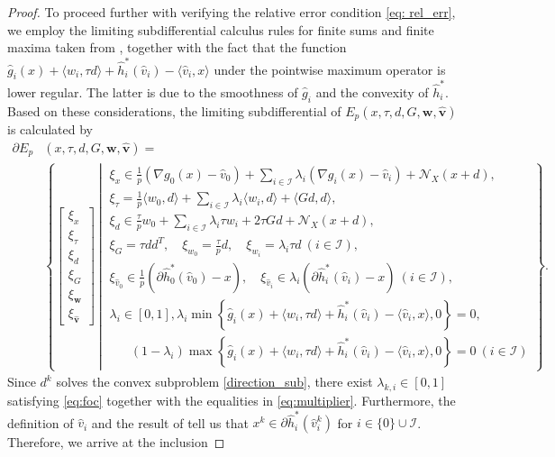 \documentclass[11pt,a4paper]{article}
\def\hat{\widehat}\def\Hat{\widehat}
\theoremstyle{plain}
\begin{document}
\begin{proof}
To proceed further with verifying the relative error condition \eqref{eq: rel_err}, we employ the limiting subdifferential calculus rules for finite sums and finite maxima taken from \cite[Theorem~2.19 and 4.10]{mordukhovich2018variational}, together {with} the fact that the function $\hat g_i(x)+\langle w_i,\tau d\rangle+\hat{h}_i^*(\hat v_i)-\langle \hat{v}_i,x\rangle$ under the pointwise maximum operator is lower regular. The latter is due to the smoothness of $\hat g_i$ and the convexity of $\hat{h}_i^*$.
Based on these considerations, the limiting subdifferential of $E_{p}(x,\tau,d,G,{\mathbf{w},\mathbf{\hat{v}}})$ is calculated by
\begin{equation*}
    \begin{aligned}
        \partial E_p&(x,\tau,d,G,{\mathbf{w},\mathbf{\hat{v}}}) =\\
        &\left\{
\begin{bmatrix}
\xi_x\\ \xi_\tau\\ \xi_d \\ \xi_G \\ {\xi_{\mathbf{w}}}\\ {\xi_{\mathbf{\hat{v}}}}
\end{bmatrix} 
~\left| ~\begin{array}{l}
\xi_x \in \frac{1}{p}\left(\nabla g_0(x) - {\hat{v}_0} \right) + {\sum_{i\in\mathcal I} \lambda_i}\left( \nabla g_i(x) - {\hat{v}_i}\right) + \mathcal{N}_X(x+d),\\
\xi_\tau = \frac{1}{p}\langle w_0, d \rangle + {\sum_{i\in\mathcal I} \lambda_i} \langle w_i, d \rangle + \langle Gd,d\rangle, \\
\xi_d \in \frac{\tau}{p}w_0 + {\sum_{i\in\mathcal I} \lambda_i} \tau w_i + 2\tau G d + \mathcal{N}_X(x+d), \\
\xi_G = {\tau} dd^T, \quad {\xi_{w_0} = \frac{\tau}{p}d, \quad \xi_{w_i} = \lambda_i \tau d \ (i\in\mathcal I)}, \\
{\xi_{\hat{v}_0}} \in \frac{1}{p}\left(\partial \hat{h}_0^*({\hat{v}_0})-x\right), \quad {\xi_{\hat{v}_i}} \in {\lambda_i}\left(\partial \hat{h}_i^*({\hat{v}_i})-x\right) {\ (i\in\mathcal I)}, \\
{\lambda_i} \in [0,1], {\lambda_i} \min\left\{\hat{g}_i(x)+\langle w_i,\tau d\rangle+\hat{h}_i^*({\hat{v}_i})-\langle {\hat{v}_i},x\rangle, 0 \right\} = 0, \\ 
\quad\,\,\,\, (1- {\lambda_i})\max\left\{ \hat{g}_i(x)+\langle w_i,\tau d\rangle+\hat{h}_i^*({\hat{v}_i})-\langle {\hat{v}_i},x\rangle, 0 \right\} = 0 {\ (i\in\mathcal I)}
\end{array}\right. \right\}.
    \end{aligned}
\end{equation*}
Since $d^k$ solves the convex subproblem \eqref{direction_sub}, there {exist $\lambda_{k,i} \in \left[0, 1\right]$} satisfying \eqref{eq:foc} together with the equalities in \eqref{eq:multiplier}. Furthermore, the definition of $\hat{v}_i$ and the result of \cite[Theorem~4.20]{beck2017first} tell us that $x^k\in\partial\hat{h}_i^*(\hat v_i^k)$ for {$i \in \{0\}\cup\mathcal I$}.
Therefore, we arrive at the inclusion


\end{proof}
\end{document}
